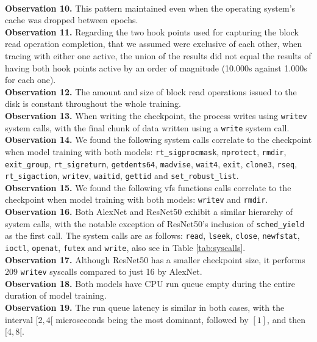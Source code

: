 \documentclass[conference]{IEEEtran}
\begin{document}
\\
\textbf{Observation 10.} This pattern maintained even when the operating system's cache was dropped between epochs.
\\
\textbf{Observation 11.} Regarding the two hook points used for capturing the block read operation completion, that we assumed were exclusive of each other, when tracing with either one active, the union of the results did not equal the results of having both hook points active by an order of magnitude (10.000s against 1.000s for each one).
\\
\textbf{Observation 12.} The amount and size of block read operations issued to the disk is constant throughout the whole training.
\\
\textbf{Observation 13.} When writing the checkpoint, the process writes using \texttt{writev} system calls, with the final chunk of data written using a \texttt{write} system call.
\\
\textbf{Observation 14.} We found the following system calls correlate to the checkpoint when model training with both models: \texttt{rt\_sigprocmask}, \texttt{mprotect}, \texttt{rmdir}, \texttt{exit\_group}, \texttt{rt\_sigreturn}, \texttt{getdents64}, \texttt{madvise}, \texttt{wait4}, \texttt{exit}, \texttt{clone3}, \texttt{rseq}, \texttt{rt\_sigaction}, \texttt{writev}, \texttt{waitid}, \texttt{gettid} and \texttt{set\_robust\_list}.
\\
\textbf{Observation 15.} We found the following vfs functions calls correlate to the checkpoint when model training with both models: \texttt{writev} and \texttt{rmdir}.
\\
\textbf{Observation 16.} Both AlexNet and ResNet50 exhibit a similar hierarchy of system calls, with the notable exception of ResNet50's inclusion of \texttt{sched\_yield} as the first call. The system calls are as follows: \texttt{read}, \texttt{lseek}, \texttt{close}, \texttt{newfstat}, \texttt{ioctl}, \texttt{openat}, \texttt{futex} and \texttt{write}, also see in Table \ref{tab:syscalls}.
\\
\textbf{Observation 17.} Although ResNet50 has a smaller checkpoint size, it performs 209 \texttt{writev} syscalls compared to just 16 by AlexNet.
\\
\textbf{Observation 18.} Both models have CPU run queue empty during the entire duration of model training.
\\
\textbf{Observation 19.} The run queue latency is similar in both cases, with the interval \([2, 4[\) microseconds being the most dominant, followed by \([1]\), and then \([4, 8[\).
\end{document}
